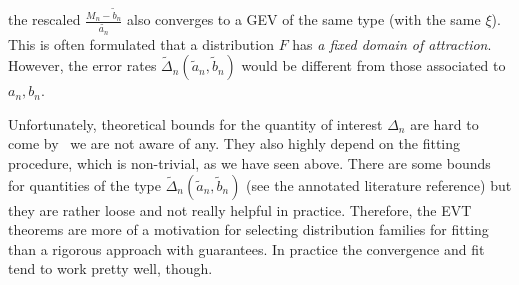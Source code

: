 the rescaled $\frac{M_n-\tilde{b}_n}{\tilde{a_n}}$ also converges to a GEV of
the same type (with the same $\xi$). This is often formulated that a
distribution $F$ has \textit{a fixed domain of attraction}. However, the error rates
$\tilde{\Delta}_n(\tilde{a}_n, \tilde{b}_n)$ would be different from those
associated to $a_n, b_n$.

Unfortunately, theoretical bounds for the quantity of interest $\Delta_n$ are
hard to come by \textemdash\ we are not aware of any. They also highly depend on the
fitting procedure, which is non-trivial, as we have seen above. There are some
bounds for quantities of the type $\tilde{\Delta}_n(\tilde{a}_n, \tilde{b}_n)$
(see the annotated literature reference) but they are rather loose and not
really helpful in practice. Therefore, the EVT theorems are more of a motivation
for selecting distribution families for fitting than a rigorous approach with
guarantees. In practice the convergence and fit tend to work pretty well,
though.
